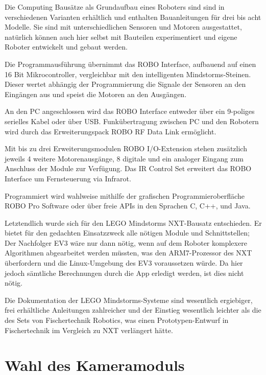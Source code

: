 Die Computing Bausätze als Grundaufbau eines Roboters sind sind in verschiedenen Varianten erhältlich und enthalten Bauanleitungen für drei bis acht Modelle. Sie sind mit unterschiedlichen Sensoren und Motoren ausgestattet, natürlich können auch hier selbst mit Bauteilen experimentiert und eigene Roboter entwickelt und gebaut werden.

Die Programmausführung übernimmt das ROBO Interface, aufbauend auf einen 16 Bit Mikrocontroller, vergleichbar mit den intelligenten Mindstorms-Steinen. Dieser wertet abhängig der Programmierung die Signale der Sensoren an den Eingängen aus und speist die Motoren an den Ausgängen.

An den PC angeschlossen wird das ROBO Interface entweder über ein 9-poliges serielles Kabel oder über USB. Funkübertragung zwischen PC und den Robotern wird durch das Erweiterungspack ROBO RF Data Link ermöglicht.

Mit bis zu drei Erweiterungsmodulen ROBO I/O-Extension stehen zusätzlich jeweils 4 weitere Motorenausgänge, 8 digitale und ein analoger Eingang zum Anschluss der Module zur Verfügung. Das IR Control Set erweitert das ROBO Interface um Fernsteuerung via Infrarot.

Programmiert wird wahlweise mithilfe der grafischen Programmieroberfläche ROBO Pro Software oder über freie APIs in den Sprachen C, C++, und Java.

\vspace{2em}

Letztendlich wurde sich für den LEGO Mindstorms NXT-Bausatz entschieden. Er bietet für den gedachten Einsatzzweck alle nötigen Module und Schnittstellen; Der Nachfolger EV3 wäre nur dann nötig, wenn auf dem Roboter komplexere Algorithmen abgearbeitet werden müssten, was den ARM7-Prozessor des NXT überfordern und die Linux-Umgebung des EV3 voraussetzen würde. Da hier jedoch sämtliche Berechnungen durch die App erledigt werden, ist dies nicht nötig.

Die Dokumentation der LEGO Mindstorms-Systeme sind wesentlich ergiebiger, frei erhältliche Anleitungen zahlreicher und der Einstieg wesentlich leichter als die des Sets von Fischertechnik Robotics, was einen Prototypen-Entwurf in Fischertechnik im Vergleich zu NXT verlängert hätte.

\section{Wahl des Kameramoduls}
\label{sec:Kamera}

